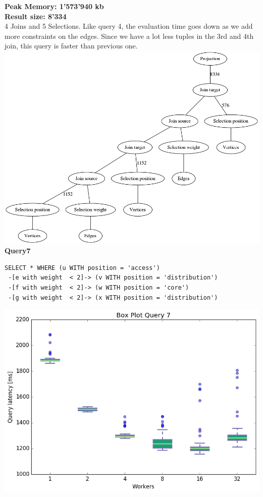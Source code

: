 \documentclass[11pt,singlecolumn]{scrartcl}
\begin{document}
\textbf{Peak Memory: 1'573'940 kb}\\
\textbf{Result size: 8'334}\\
4 Joins and 5 Selections. Like query 4, the evaluation time goes down as we add more constraints on the edges. Since we have a lot less tuples in the 3rd and 4th join, this query is faster than previous one.
\clearpage
\includegraphics[width=1\textwidth]{graph6}
\clearpage
\textbf{Query7}\\
\begin{verbatim}
SELECT * WHERE (u WITH position = 'access')
 -[e with weight  < 2]-> (v WITH position = 'distribution')
 -[f with weight  < 2]-> (w WITH position = 'core')
 -[g with weight  < 2]-> (x WITH position = 'distribution')\end{verbatim}
\includegraphics[width=1\textwidth]{box7}
\end{document}
